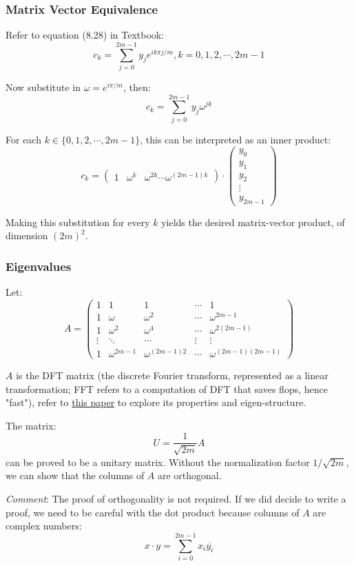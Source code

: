 \documentclass[12pt]{article} %
\newcommand{\1}[1]{\mathds{1}\left[#1\right]}
\begin{document}
\subsubsection{Matrix Vector Equivalence}
Refer to equation (8.28) in Textbook:
$$
	c_k = \sum_{j=0}^{2m-1}y_je^{ik\pi j/m}, k=0,1,2,\cdots, 2m-1
$$ 

Now substitute in $\omega = e^{i\pi/m}$, then:
$$
	c_k = \sum_{j=0}^{2m-1}y_j\omega^{jk}
$$

For each $k\in\{0,1,2,\cdots, 2m-1\}$, this can be interpreted as an inner product:
$$
	c_k = \begin{pmatrix}
	1 & \omega^{k} & \omega^{2k} \cdots \omega^{(2m-1)k}
	\end{pmatrix}\cdot
	\begin{pmatrix}
	y_0\\
	y_1\\
	y_2\\
	\vdots\\
	y_{2m-1}
	\end{pmatrix}
$$

Making this substitution for every $k$ yields the desired matrix-vector product, of dimension $(2m)^2$. 
\subsubsection{Eigenvalues}
Let:
$$
	A = 
	\begin{pmatrix}
		1 & 1 & 1 & \cdots & 1 \\
		1 & \omega & \omega^2 &\cdots & \omega^{2m-1}\\
		1 & \omega^2 & \omega^4 &\cdots & \omega^{2(2m-1)}\\
		\vdots & \ddots & \cdots & \vdots& \vdots\\
		1 & \omega^{2m-1} & \omega^{(2m-1)2} &\cdots & \omega^{(2m-1)(2m-1)}
	\end{pmatrix}
$$

$A$ is the DFT matrix (the discrete Fourier transform, represented as a linear transformation; FFT refers to a computation of DFT that saves flops, hence "fast"), refer to \href{https://ieeexplore-ieee-org.libproxy.berkeley.edu/document/1163843}{this paper} to explore its properties and eigen-structure. 

The matrix:
$$
	U = \frac{1}{\sqrt{2m}}A
$$ can be proved to be a unitary matrix. Without the normalization factor $1/\sqrt{2m}$, we can show that the columns of $A$ are orthogonal.

\emph{Comment}: The proof of orthogonality is not required. If we did decide to write a proof, we need to be careful with the dot product because columns of $A$ are complex numbers:
$$
	x \cdot y = \sum_{i=0}^{2m-1}x_i\overline{y_i}
$$
\end{document}
